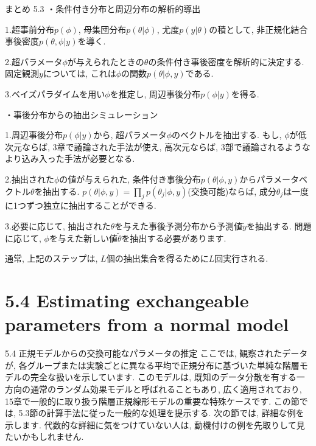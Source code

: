 \documentclass[10pt,dvipdfmx,a4]{beamer}
\begin{document}
\begin{frame}{まとめ 5.3}
・条件付き分布と周辺分布の解析的導出

1.超事前分布$p(\phi)$, 母集団分布$p(\theta|\phi)$, 尤度$p(y|\theta)$の積として, 非正規化結合事後密度$p(\theta,\phi|y)$を導く.

2.超パラメータ$\phi$が与えられたときの$\theta$の条件付き事後密度を解析的に決定する.
固定観測$y$については, これは$\phi$の関数$p(\theta|\phi, y)$である.

3.ベイズパラダイムを用い$\phi$を推定し, 周辺事後分布$p(\phi|y)$を得る.

・事後分布からの抽出シミュレーション

1.周辺事後分布$p(\phi|y)$から, 超パラメータ$\phi$のベクトルを抽出する.
もし, $\phi$が低次元ならば, 3章で議論された手法が使え, 高次元ならば, 3部で議論されるようなより込み入った手法が必要となる.

2.抽出された$\phi$の値が与えられた, 条件付き事後分布$p(\theta|\phi,y)$からパラメータベクトル$\theta$を抽出する.
$p(\theta|\phi, y)=\prod_j p(\theta_j|\phi,y)$(交換可能)ならば, 成分$\theta_j$は一度に1つずつ独立に抽出することができる.

3.必要に応じて, 抽出された$\theta$を与えた事後予測分布から予測値$\tilde{y}$を抽出する.
問題に応じて, $\phi$を与えた新しい値$\tilde{\theta}$を抽出する必要があります.

通常, 上記のステップは, $L$個の抽出集合を得るために$L$回実行される.
\end{frame}

\section{5.4 Estimating exchangeable parameters from a normal model}
\begin{frame}{5.4 正規モデルからの交換可能なパラメータの推定}
ここでは, 観察されたデータが, 各グループまたは実験ごとに異なる平均で正規分布に基づいた単純な階層モデルの完全な扱いを示しています.
このモデルは, 既知のデータ分散を有する一方向の通常のランダム効果モデルと呼ばれることもあり, 広く適用されており, 15章で一般的に取り扱う階層正規線形モデルの重要な特殊ケースです.
この節では, 5.3節の計算手法に従った一般的な処理を提示する.
次の節では, 詳細な例を示します.
代数的な詳細に気をつけていない人は, 動機付けの例を先取りして見たいかもしれません.
\end{frame}

\end{document}
